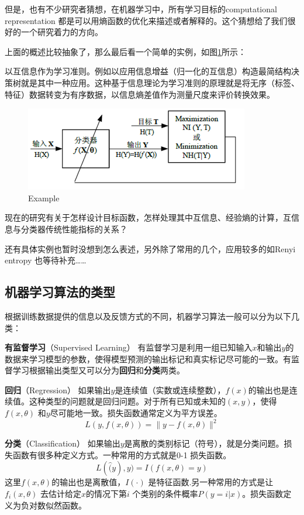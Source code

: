 \documentclass[11pt,fleqn, UTF8]{ctexbook} %
\begin{document}
但是，也有不少研究者猜想\cite{hu2015information}，在机器学习中，所有学习目标的computational representation 都是可以用熵函数的优化来描述或者解释的。这个猜想给了我们很好的一个研究着力的方向。

上面的概述比较抽象了，那么最后看一个简单的实例，如图\ref{fig:3.5}所示：

以互信息作为学习准则。例如以应用信息增益（归一化的互信息）构造最简结构决策树就是其中一种应用。这种基于信息理论为学习准则的原理就是将无序（标签、特征）数据转变为有序数据，以信息熵差值作为测量尺度来评价转换效果。

\begin{figure}[t]
 \centering
 \includegraphics{pics/35.png}
 \caption{Example}
 \label{fig:3.5}
\end{figure}

现在的研究有关于怎样设计目标函数，怎样处理其中互信息、经验熵的计算，互信息与分类器传统性能指标的关系？

还有具体实例也暂时没想到怎么表述，另外除了常用的几个，应用较多的如Renyi entropy 也等待补充……


\subsection{机器学习算法的类型}
根据训练数据提供的信息以及反馈方式的不同，机器学习算法一般可以分为以下几类：

\textbf{有监督学习}（Supervised Learning） 有监督学习是利用一组已知输入$x$和输出$y$的数据来学习模型的参数，使得模型预测的输出标记和真实标记尽可能的一致。有监督学习根据输出类型又可以分为\textbf{回归}和\textbf{分类}两类。

\textbf{回归}（Regression） 如果输出$y$是连续值（实数或连续整数），$f(x)$的输出也是连续值。这种类型的问题就是回归问题。对于所有已知或未知的$(x, y)$，使得$f(x, \theta)$ 和$y$尽可能地一致。损失函数通常定义为平方误差。
\begin{equation}\label{3.13}
  L(y,f(x,\theta))=\|y-f(x,\theta)\|^2
\end{equation}

\textbf{分类}（Classification） 如果输出$y$是离散的类别标记（符号），就是分类问题。损失函数有很多种定义方式。一种常用的方式就是0-1 损失函数。
\begin{equation}\label{3.14}
  L(\hat(y),y)=I(f(x,\theta)=y)
\end{equation}
这里$f(x, \theta)$的输出也是离散值，$I(\cdot)$ 是特征函数.另一种常用的方式是让$f_i(x, \theta)$ 去估计给定$x$的情况下第$i$ 个类别的条件概率$P(y = i|x)$。损失函数定义为负对数似然函数。
\end{document}
